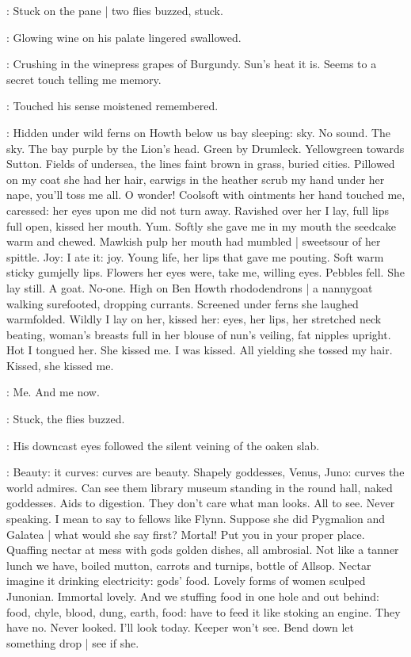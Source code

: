 :
Stuck on the pane |
two flies buzzed,
stuck.

:
Glowing wine on his palate lingered swallowed.

\BloomInt:
Crushing in the winepress grapes of Burgundy.
Sun's heat it is.
Seems to a secret touch telling me memory.

:
Touched his sense moistened remembered.

\BloomInt:
Hidden under wild ferns on Howth below us bay sleeping:
sky.
No sound.
The sky.
The bay purple by the Lion's head.
Green by Drumleck.
Yellowgreen towards Sutton.
Fields of undersea,
the lines faint brown in grass,
buried cities.
Pillowed on my coat she had her hair,
earwigs in the heather scrub my hand under her nape,
you'll toss me all.
O wonder!
Coolsoft with ointments her hand touched me,
caressed:
her eyes upon me did not turn away.
Ravished over her I lay,
full lips full open,
kissed her mouth.
Yum.
Softly she gave me in my mouth the seedcake warm and chewed.
Mawkish pulp her mouth had mumbled |
sweetsour of her spittle.
Joy:
I ate it:
joy.
Young life,
her lips that gave me pouting.
Soft warm sticky gumjelly lips.
Flowers her eyes were,
take me,
willing eyes.
Pebbles fell.
She lay still.
A goat.
No-one.
High on Ben Howth rhododendrons |
a nannygoat walking surefooted, dropping currants.
Screened under ferns she laughed warmfolded.
Wildly I lay on her,
kissed her:
eyes, her lips,
her stretched neck beating,
woman's breasts full in her blouse of nun's veiling,
fat nipples upright.
Hot I tongued her.
She kissed me.
I was kissed.
All yielding she tossed
my hair.
Kissed, she kissed me.

\BloomInt:
Me.
And me now.

:
Stuck,
the flies buzzed.

:
His downcast eyes followed the silent veining of the oaken slab.

\BloomInt:
Beauty:
it curves:
curves are beauty.
Shapely goddesses,
Venus, Juno:
curves the world admires.
Can see them library museum standing in the round hall,
naked goddesses.
Aids to digestion.
They don't care what man looks.
All to see.
Never speaking.
I mean to say to fellows like Flynn.
Suppose she did Pygmalion and Galatea |
what would she say first?
Mortal!
Put you in your proper place.
Quaffing nectar at mess with gods golden dishes,
all ambrosial.
Not like a tanner lunch we have,
boiled mutton, carrots and turnips,
bottle of Allsop.
Nectar imagine it drinking electricity:
gods' food.
Lovely forms of women sculped Junonian.
Immortal lovely.
And we stuffing food in one hole and out behind:
food, chyle, blood, dung, earth, food:
have to feed it like stoking an engine.
They have no.
Never looked.
I'll look today.
Keeper won't see.
Bend down let something drop |
see if she.

